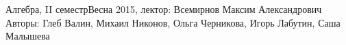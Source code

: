 


\BigHeader
	{Алгебра, II семестр}{Весна 2015, лектор: Всемирнов Максим Александрович}
	{Авторы: Глеб Валин, Михаил Никонов, Ольга Черникова, Игорь Лабутин, Саша Малышева}
	
 







